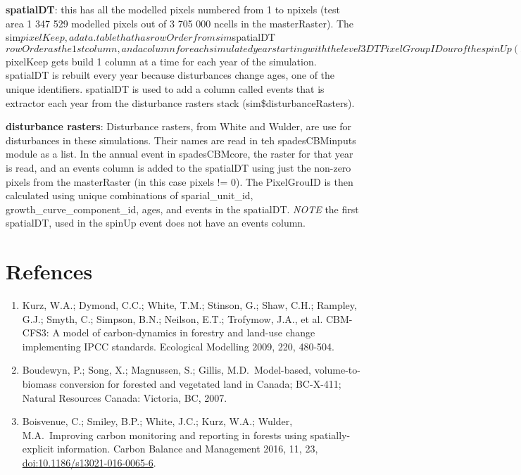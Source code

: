 \documentclass[]{article}
\providecommand{\tightlist}{%
  \setlength{\itemsep}{0pt}\setlength{\parskip}{0pt}}
\begin{document}
\textbf{spatialDT}: this has all the modelled pixels numbered from 1 to
npixels (test area 1 347 529 modelled pixels out of 3 705 000 ncells in
the masterRaster). The
sim\(pixelKeep, a data.table that has rowOrder from sim\)spatialDT\(rowOrder as the 1st column, and a column for each simulated year starting with the level3DT PixelGroupID our of the spinUp (PixelGroupID0), followed by one per simulated year (e.g., PixelGroupID1990). sim\)pixelKeep
gets build 1 column at a time for each year of the simulation. spatialDT
is rebuilt every year because disturbances change ages, one of the
unique identifiers. spatialDT is used to add a column called events that
is extractor each year from the disturbance rasters stack
(sim\$disturbanceRasters).

\textbf{disturbance rasters}: Disturbance rasters, from White and
Wulder, are use for disturbances in these simulations. Their names are
read in teh spadesCBMinputs module as a list. In the annual event in
spadesCBMcore, the raster for that year is read, and an events column is
added to the spatialDT using just the non-zero pixels from the
masterRaster (in this case pixels != 0). The PixelGrouID is then
calculated using unique combinations of sparial\_unit\_id,
growth\_curve\_component\_id, ages, and events in the spatialDT.
\emph{NOTE} the first spatialDT, used in the spinUp event does not have
an events column.

\section{Refences}\label{refences}

\begin{enumerate}
\def\labelenumi{\arabic{enumi}.}
\tightlist
\item
  Kurz, W.A.; Dymond, C.C.; White, T.M.; Stinson, G.; Shaw, C.H.;
  Rampley, G.J.; Smyth, C.; Simpson, B.N.; Neilson, E.T.; Trofymow,
  J.A., et al. CBM-CFS3: A model of carbon-dynamics in forestry and
  land-use change implementing IPCC standards. Ecological Modelling
  2009, 220, 480-504.
\item
  Boudewyn, P.; Song, X.; Magnussen, S.; Gillis, M.D.~Model-based,
  volume-to-biomass conversion for forested and vegetated land in
  Canada; BC-X-411; Natural Resources Canada: Victoria, BC, 2007.
\item
  Boisvenue, C.; Smiley, B.P.; White, J.C.; Kurz, W.A.; Wulder,
  M.A.~Improving carbon monitoring and reporting in forests using
  spatially-explicit information. Carbon Balance and Management 2016,
  11, 23, \url{doi:10.1186/s13021-016-0065-6}.
\end{enumerate}
\end{document}
